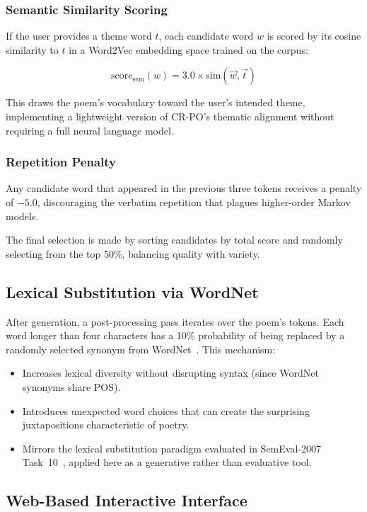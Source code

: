 \documentclass[conference]{IEEEtran}
\begin{document}
\subsubsection{Semantic Similarity Scoring}
If the user provides a theme word $t$, each candidate word $w$ is scored by its cosine similarity to $t$ in a Word2Vec embedding space trained on the corpus:

\begin{equation}
    \text{score}_{\text{sem}}(w) = 3.0 \times \text{sim}(\vec{w}, \vec{t})
\end{equation}

This draws the poem's vocabulary toward the user's intended theme, implementing a lightweight version of CR-PO's thematic alignment without requiring a full neural language model.

\subsubsection{Repetition Penalty}
Any candidate word that appeared in the previous three tokens receives a penalty of $-5.0$, discouraging the verbatim repetition that plagues higher-order Markov models.

The final selection is made by sorting candidates by total score and randomly selecting from the top 50\%, balancing quality with variety.

\subsection{Lexical Substitution via WordNet}

After generation, a post-processing pass iterates over the poem's tokens. Each word longer than four characters has a 10\% probability of being replaced by a randomly selected synonym from WordNet~\cite{miller1993wordnet}. This mechanism:
\begin{itemize}
    \item Increases lexical diversity without disrupting syntax (since WordNet synonyms share POS).
    \item Introduces unexpected word choices that can create the surprising juxtapositions characteristic of poetry.
    \item Mirrors the lexical substitution paradigm evaluated in SemEval-2007 Task~10~\cite{mccarthy2007semeval}, applied here as a generative rather than evaluative tool.
\end{itemize}

\subsection{Web-Based Interactive Interface}
\end{document}
